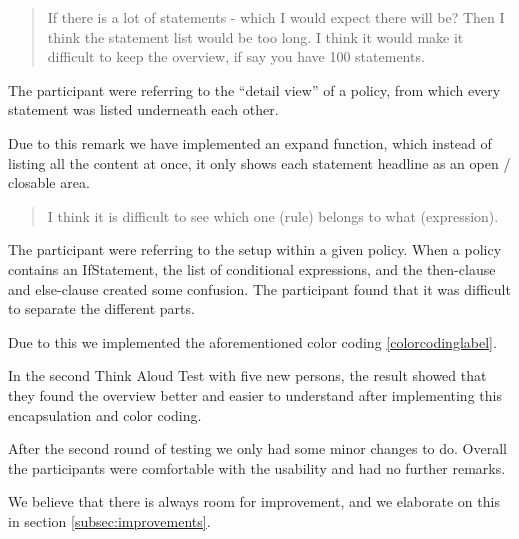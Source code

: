 \begin{quotation}
If there is a lot of statements - which I would expect there will be? Then I think the statement list would be too long. I think it would make it difficult to keep the overview, if say you have 100 statements.
\end{quotation}

The participant were referring to the “detail view” of a policy, from which every statement was listed underneath each other. 

Due to this remark we have implemented an expand function, which instead of listing all the content at once, it only shows each statement headline as an open / closable area.
 
\begin{quotation}
I think it is difficult to see which one (rule) belongs to what (expression).
\end{quotation}

The participant were referring to the setup within a given policy. When a policy contains an IfStatement, the list of conditional expressions, and the then-clause and else-clause created some confusion. The participant found that it was difficult to separate the different parts.

Due to this we implemented the aforementioned color coding \ref{colorcodinglabel}.

In the second Think Aloud Test with five new persons, the result showed that they found the overview better and easier to understand after implementing this encapsulation and color coding.

After the second round of testing we only had some minor changes to do. Overall the participants were comfortable with the usability and had no further remarks.

We believe that there is always room for improvement, and we elaborate on this in section \ref{subsec:improvements}.